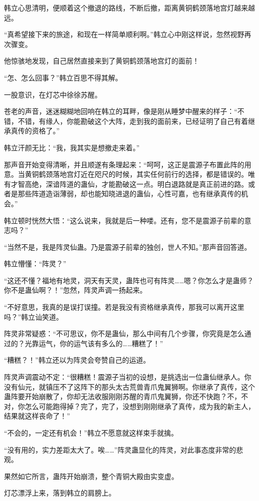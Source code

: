 \begin{this_body}
韩立心思清明，便顺着这个撤退的路线，不断后撤，距离黄铜鹤颈落地宫灯越来越远。

“真希望接下来的旅途，和现在一样简单顺利啊。”韩立心中刚这样说，忽然视野再次骤变。

他惊骇地发现，自己居然直接来到了黄铜鹤颈落地宫灯的面前！

“怎、怎么回事？”韩立百思不得其解。

一股意识，在灯芯中徐徐苏醒。

苍老的声音，迷迷糊糊地回响在韩立的耳畔，像是刚从睡梦中醒来的样子：“不错，不错，有缘人，你能勘破这个大阵，走到我的面前来，已经证明了自己有着继承真传的资格了。”

韩立汗颜无比：“我，我其实是想撤走来着。”

那声音开始变得清晰，并且顺遂有条理起来：“呵呵，这正是震源子布置此阵的用意。当黄铜鹤颈落地宫灯近在咫尺的时候，其实任何前行的选择，都是错误的。唯有才智高绝，深谙阵道的蛊仙，才能勘破这一点。明白退路就是真正前进的路。或者是那些阵道造诣薄弱，却也能知晓进退的蛊仙，心性可嘉，也有继承真传的机会。”

韩立顿时恍然大悟：“这么说来，我就是后一种喽。还有，您不是震源子前辈的意志吗？”

“当然不是，我是阵灵仙蛊。乃是震源子前辈的独创，世人不知。”那声音回答道。

韩立懵懂：“阵灵？”

“这还不懂？福地有地灵，洞天有天灵，蛊阵也可有阵灵……嗯？你怎么才是蛊师？你不是蛊仙啊？！”忽然，阵灵声调一扬起来。

“不好意思，我真的是误打误撞。若是我没有资格继承真传，那我可以离开这里吗？”韩立讪笑道。

阵灵非常疑惑：“不可思议，你不是蛊仙，那么中间有几个步骤，你究竟是怎么通过的？光靠运气，你的运气该有多么的……糟糕了！”

“糟糕？！”韩立还以为阵灵会夸赞自己的运道。

阵灵声调震动不定：“很糟糕！震源子当初的设想，是挑选出一位蛊仙继承人。你没有仙元，就镇压不了这阵下的那头太古荒兽青爪鬼翼狮啊。你继承了真传，这个蛊阵要开始崩散了，你却无法收服刚刚苏醒的青爪鬼翼狮，你还不快跑？不，不对，你怎么可能跑得掉？完了，完了，没想到刚刚继承了真传，成为我的新主人，结果就这样丧命了！”

“不会的，一定还有机会！”韩立不愿意就这样束手就擒。

“没有用的，实力差距太大了。唉……”阵灵蛊显化的阵灵，对此事态度非常的悲观。

果然如它所言，蛊阵开始崩溃，整个青铜大殿由实变虚。

灯芯漂浮上来，落到韩立的肩膀上。


\end{this_body}

